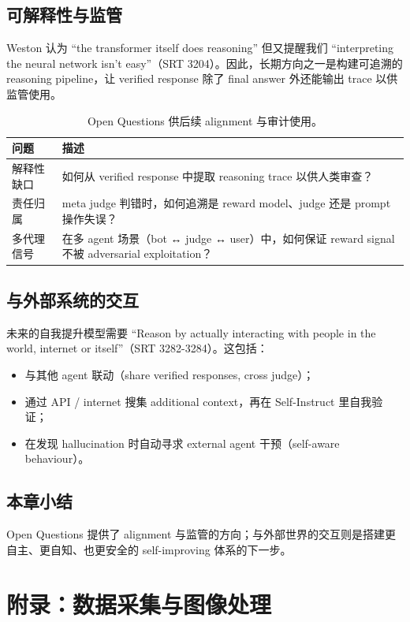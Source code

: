 \documentclass[a4paper]{article}
\begin{document}
\subsection{可解释性与监管}
Weston 认为 ``the transformer itself does reasoning'' 但又提醒我们 ``interpreting the neural network isn't easy''（SRT 3204）。因此，长期方向之一是构建可追溯的 reasoning pipeline，让 verified response 除了 final answer 外还能输出 trace 以供监管使用。

\begin{table}[H]
\centering
\begin{tabular}{p{5cm}p{10cm}}
\toprule
问题 & 描述 \\
\midrule
解释性缺口 & 如何从 verified response 中提取 reasoning trace 以供人类审查？ \\
责任归属 & meta judge 判错时，如何追溯是 reward model、judge 还是 prompt 操作失误？ \\
多代理信号 & 在多 agent 场景（bot ↔ judge ↔ user）中，如何保证 reward signal 不被 adversarial exploitation？ \\
\bottomrule
\end{tabular}
\caption{Open Questions 供后续 alignment 与审计使用。}
\end{table}

\subsection{与外部系统的交互}
未来的自我提升模型需要 ``Reason by actually interacting with people in the world, internet or itself''（SRT 3282-3284）。这包括：
\begin{itemize}
    \item 与其他 agent 联动（share verified responses, cross judge）；
    \item 通过 API / internet 搜集 additional context，再在 Self-Instruct 里自我验证；
    \item 在发现 hallucination 时自动寻求 external agent 干预（self-aware behaviour）。
\end{itemize}

\subsection{本章小结}
Open Questions 提供了 alignment 与监管的方向；与外部世界的交互则是搭建更自主、更自知、也更安全的 self-improving 体系的下一步。

\section{附录：数据采集与图像处理}
\end{document}
